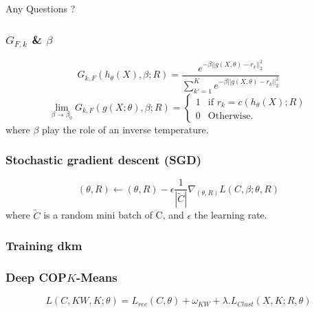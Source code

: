 \documentclass{beamer}
\begin{document}
\begin{frame}
Any Questions ?
\end{frame}

\begin{frame}
\frametitle{$G_{F,k}$ \& $\beta$}
\begin{equation*}
G_{k, F}(h_{\theta}(X), \beta; R) = \frac{e^{-\beta ||g(X, \theta) - r_k||_2^2}}
{\sum_{k' = 1}^K e^{-\beta ||g(X, \theta) - r_k||_2^2}}
\end{equation*}
\begin{equation*}
  \lim\limits_{\beta \rightarrow \beta_0}G_{k, F}(g(X; \theta), \beta; R) = \left\{
\begin{array}{ll}
  1 & \mbox{if }r_k = c(h_\theta(X); R)\\
  0 & \mbox{Otherwise.}
\end{array}
\right.
\end{equation*}
where $\beta$ play the role of an inverse temperature.
\end{frame}

\begin{frame}
\frametitle{Stochastic gradient descent (SGD)}
\begin{equation*}
  (\theta, R) \gets (\theta, R) - \epsilon \frac{1}{|\widetilde{C}|}
  \nabla_{(\theta, R)} L(C, \beta; \theta, R)
\end{equation*}
where $\widetilde{C}$ is a random mini batch of C, and $\epsilon$ the
learning rate.
\end{frame}
\begin{frame}
\frametitle{Training dkm}
\end{frame}

\begin{frame}
\frametitle{Deep COP$K$-Means}
\begin{equation*}
  L( C, KW, K; \theta) = L_{rec}(C, \theta) + \omega_{KW} + \lambda.L_{Clust}(X, K;R, \theta)
\end{equation*}
\end{frame}
\end{document}
